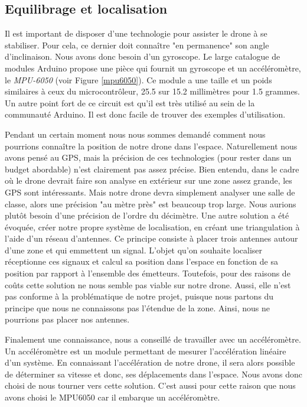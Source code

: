 \documentclass[a4paper,10pt]{report}
\begin{document}
      \subsection{Equilibrage et localisation}
	Il est important de disposer d'une technologie pour assister le drone à 
se stabiliser. Pour cela, ce dernier doit connaître "en permanence" son angle 
d'inclinaison. Nous avons donc besoin d'un gyroscope. Le large catalogue de 
modules Arduino propose une pièce qui fournit un gyroscope et un 
accéléromètre, le \textit{MPU-6050} (voir Figure \ref{mpu6050}). Ce module a 
une taille et un poids similaires à ceux du microcontrôleur, 25.5 sur 15.2 
millimètres pour 1.5 grammes. Un autre point fort de ce circuit est qu'il est 
très utilisé au sein de la communauté Arduino. Il est donc facile de trouver 
des exemples d'utilisation.
	
	Pendant un certain moment nous nous sommes demandé comment nous 
pourrions connaître la position de notre drone dans l'espace. Naturellement 
nous avons pensé au GPS, mais la précision de ces technologies (pour rester dans 
un budget abordable) n'est clairement pas assez précise. Bien entendu, dans le 
cadre où le drone devrait faire son analyse en extérieur sur une zone assez 
grande, les GPS sont intéressants. Mais notre drone devra simplement analyser 
une salle de classe, alors une précision "au mètre près" est beaucoup trop 
large. Nous aurions plutôt besoin d'une précision de l’ordre du décimètre.  Une 
autre solution a été évoquée, créer notre propre système de localisation, en 
créant une triangulation\cite{triangulation} à l’aide d’un réseau d’antennes. 
Ce principe consiste à placer trois antennes autour d'une zone et qui emmettent 
un signal. L'objet qu'on souhaite localiser réceptionne ces signaux et calcul 
sa position dans l'espace en fonction de sa position par rapport à l'ensemble 
des émetteurs. Toutefois, pour des raisons de coûts cette solution ne nous 
semble pas viable sur notre drone. Aussi, elle n'est pas conforme à la 
problématique de notre projet, puisque nous partons du principe que nous ne 
connaissons pas l'étendue de la zone. Ainsi, nous ne pourrions pas placer nos 
antennes.

	Finalement une connaissance, nous a conseillé de travailler avec un 
accéléromètre. Un accéléromètre est un module permettant de mesurer 
l'accélération linéaire d’un système. En connaissant l'accélération de notre 
drone, il sera alors possible de déterminer sa vitesse et donc, ses déplacements 
dans l’espace. Nous avons donc choisi de nous tourner vers cette solution. 
C'est aussi pour cette raison que nous avons choisi le MPU6050 car il embarque 
un accéléromètre.
	
\end{document}
